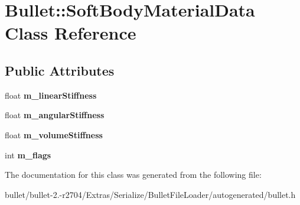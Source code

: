\hypertarget{class_bullet_1_1_soft_body_material_data}{\section{Bullet\+:\+:Soft\+Body\+Material\+Data Class Reference}
\label{class_bullet_1_1_soft_body_material_data}
}
\subsection*{Public Attributes}
\begin{DoxyCompactItemize}
\item 
\hypertarget{class_bullet_1_1_soft_body_material_data_a008f2bc65a825b2e5243da99ca93d4e4}{float {\bfseries m\+\_\+linear\+Stiffness}}\label{class_bullet_1_1_soft_body_material_data_a008f2bc65a825b2e5243da99ca93d4e4}

\item 
\hypertarget{class_bullet_1_1_soft_body_material_data_ad71ba11f3a7d76a86b1ef1b7ce01cb8d}{float {\bfseries m\+\_\+angular\+Stiffness}}\label{class_bullet_1_1_soft_body_material_data_ad71ba11f3a7d76a86b1ef1b7ce01cb8d}

\item 
\hypertarget{class_bullet_1_1_soft_body_material_data_a5722ac2398629f9dcbeecc54ac984593}{float {\bfseries m\+\_\+volume\+Stiffness}}\label{class_bullet_1_1_soft_body_material_data_a5722ac2398629f9dcbeecc54ac984593}

\item 
\hypertarget{class_bullet_1_1_soft_body_material_data_a87dd0744933f855323a5c64896b7ac22}{int {\bfseries m\+\_\+flags}}\label{class_bullet_1_1_soft_body_material_data_a87dd0744933f855323a5c64896b7ac22}

\end{DoxyCompactItemize}


The documentation for this class was generated from the following file\+:\begin{DoxyCompactItemize}
\item 
bullet/bullet-\/2.-\/r2704/\+Extras/\+Serialize/\+Bullet\+File\+Loader/autogenerated/bullet.\+h\end{DoxyCompactItemize}
